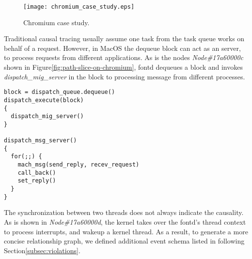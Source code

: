 \begin{figure}[tb]
    \centering
    \texttt{[image: chromium\_case\_study.eps]}
    \caption{Chromium case study.}
    \label{fig:chromium-trace}
\end{figure}

Traditional causal tracing usually assume one task from
the task queue works on behalf of a request.
However, in MacOS the dequeue block can act as an server,
to process requests from different applications.
As is the nodes \textit{Node\#17a60000c} shown in Figure\ref{fig:path-slice-on-chromium},
fontd dequeues a block and invokes \textit{dispatch\_mig\_server}
in the block to processing message from
different processes.
\begin{lstlisting}[basicstyle=\small\linespread{0.6}]
block = dispatch_queue.dequeue()
dispatch_execute(block)
{
  dispatch_mig_server()
}

dispatch_msg_server()
{
  for(;;) {
    mach_msg(send_reply, recev_request)
    call_back()
    set_reply()
  }
}
\end{lstlisting}

The synchronization between two threads does not
always indicate the causality.
As is shown in \textit{Node\#17a60000d}, the kernel takes over the fontd's thread context to process
interrupts, and wakeup a kernel thread.
As a result, to generate a more concise relationship graph,
we defined additional event schema listed in following Section\ref{subsec:violations}.

